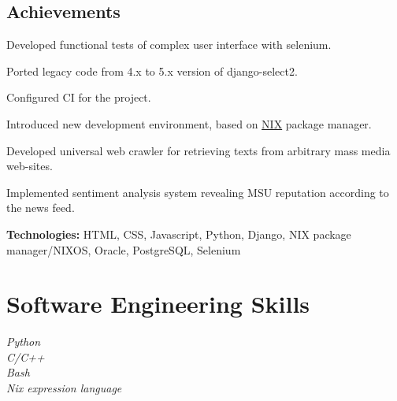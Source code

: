 \documentclass[10pt]{article} %
\begin{document}
{\begin{itemize-noindent}
\subsection{Achievements}
\item{Developed functional tests of complex user interface with selenium.}
\item{Ported legacy code from 4.x to 5.x version of django-select2.}
\item{Configured CI for the project.}
\item{Introduced new development environment, based on \href{https://nixos.org/nix/}{NIX} package manager.}
\item{Developed universal web crawler for retrieving texts from arbitrary mass media web-sites.}
\item{Implemented sentiment analysis system revealing MSU reputation according to the news feed.}
\end{itemize-noindent}

\rule{0mm}{5mm}\textbf{Technologies:} HTML, CSS, Javascript, Python, Django, NIX package manager/NIXOS, Oracle, PostgreSQL, Selenium}





\section{Software Engineering Skills}

{
\textit{Python}\\
\textit{C/C++}\\
\textit{Bash}\\
\textit{Nix expression language}
}

\end{document}
